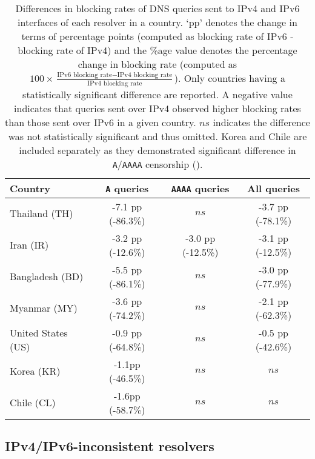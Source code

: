 \begin{table}[t]
  \centering
  \small
  \scalebox{\tabularscale} {
  \begin{tabular}{lccc}%
    \toprule
    {\bf Country}&{\bf {\tt A} queries }&{\bf {\tt AAAA} queries} & {\bf All queries}
    \\ \midrule
    Thailand (TH)      & -7.1 pp (-86.3\%) & $ns$              & -3.7 pp (-78.1\%) \\
    Iran (IR)          & -3.2 pp (-12.6\%) & -3.0 pp (-12.5\%) & -3.1 pp (-12.5\%) \\ 
    Bangladesh (BD)    & -5.5 pp (-86.1\%) & $ns$              & -3.0 pp (-77.9\%) \\
    Myanmar (MY)       & -3.6 pp (-74.2\%) & $ns$              & -2.1 pp (-62.3\%) \\
    United States (US) & -0.9 pp (-64.8\%) & $ns$              & -0.5 pp (-42.6\%) \\
    \midrule
    Korea (KR)         & -1.1pp (-46.5\%) & $ns$    & $ns$ \\
    Chile (CL)         & -1.6pp (-58.7\%)  & $ns$    & $ns$ \\
    \bottomrule
  \end{tabular}
  }
  \caption{Differences in blocking rates of DNS queries sent to IPv4 and IPv6
  interfaces of each resolver in a country. `pp' denotes the change in
  terms of percentage points (computed as blocking rate of IPv6 - blocking
  rate of IPv4) and the \%age value denotes the percentage change in blocking rate
  (computed as 
  $
  100 \times \frac{\text{IPv6 blocking rate} - \text{IPv4 blocking rate}}
  {\text{IPv4 blocking rate}}
  $). 
  Only countries having a statistically significant difference are reported. A
  negative value indicates that queries sent over IPv4 observed higher blocking
  rates than those sent over IPv6 in a given country. $ns$ indicates the
  difference was not statistically significant and thus omitted. Korea and Chile
  are included separately as they demonstrated significant difference in
  \texttt{A}/\texttt{AAAA} censorship ().}
  \label{tab:v4vsv6-infrastructure:countries}
\end{table}

\subsection{IPv4/IPv6-inconsistent resolvers}
\label{sec:v4vsv6-infrastructure:resolvers}
%

